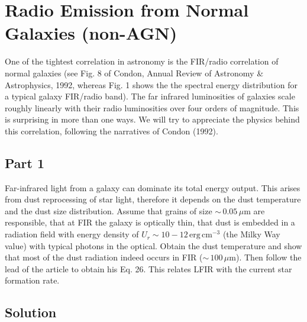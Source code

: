 \documentclass[12pt]{article}
\begin{document}

\section{Radio Emission from Normal Galaxies (non-AGN)}

One of the tightest correlation in astronomy is the FIR/radio correlation of normal galaxies (see Fig. 8 of Condon, Annual Review of Astronomy \& Astrophysics, 1992, whereas Fig. 1 shows the the spectral energy distribution for a typical galaxy FIR/radio band). The far infrared luminosities of galaxies scale roughly linearly with their radio luminosities over four orders of magnitude. This is surprising in more than one ways. We will try to appreciate the physics behind this correlation, following the narratives of Condon (1992).


\subsection*{Part 1}

Far-infrared light from a galaxy can dominate its total energy output. This arises from dust reprocessing of star light, therefore it depends on the dust temperature and the dust size distribution. Assume that grains of size $\sim\,0.05\,\mu\mathrm{m}$ are responsible, that at FIR the galaxy is optically thin, that dust is embedded in a radiation field with energy density of $U_r \sim 10-12\,\mathrm{erg\,cm^{-3}}$ (the Milky Way value) with typical photons in the optical. Obtain the dust temperature and show that most of the dust radiation indeed occurs in FIR ($\sim\,100\,\mu\mathrm{m}$). Then follow the lead of the article to obtain his Eq. 26. This relates LFIR with the current star formation rate.


\subsection*{Solution}
\end{document}
